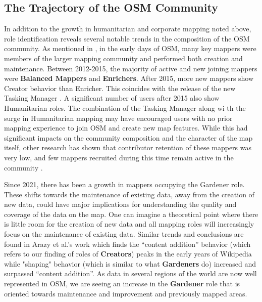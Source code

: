 \documentclass[manuscript,screen,review]{acmart}
\begin{document}
\subsection{The Trajectory of the OSM Community}

In addition to the growth in humanitarian and corporate mapping noted above, role identification reveals several notable trends in the composition of the OSM community. As mentioned in \cite{palen15}, in the early days of OSM, many key mappers were members of the larger mapping community and performed both creation and maintenance. Between 2012-2015, the majority of active and new joining mappers were \textbf{Balanced Mappers} and \textbf{Enrichers}. After 2015, more new mappers show Creator behavior than Enricher. This coincides with the release of the new Tasking Manager \cite{palen15,herfort2021evolution}. A significant number of users after 2015 also show Humanitarian roles. The combination of the Tasking Manager along wi th the surge in Humanitarian mapping may have encouraged users with no prior mapping experience to join OSM and create new map features. While this had significant impacts on the community composition and the character of the map itself, other research has shown that contributor retention of these mappers was very low, and few mappers recruited during this time remain active in the community \cite{Mahmud22}.

Since 2021, there has been a growth in mappers occupying the Gardener role. These shifts towards the maintenance of existing data, away from the creation of new data, could have major implications for understanding the quality and coverage of the data on the map. One can imagine a theoretical point where there is little room for the creation of new data and all mapping roles will increasingly focus on the maintenance of existing data. Similar trends and conclusions are found in Arazy et al.'s work\cite{Arazy20} which finds the “content addition” behavior (which refers to our finding of roles of \textbf{Creators}) peaks in the early years of Wikipedia while "shaping" behavior (which is similar to what \textbf{Gardeners} do) increased and surpassed “content addition”. As data in several regions of the world are now well represented in OSM\cite{herfort2021evolution}, we are seeing an increase in the \textbf{Gardener} role that is oriented towards maintenance and improvement and previously mapped areas. 
\end{document}
